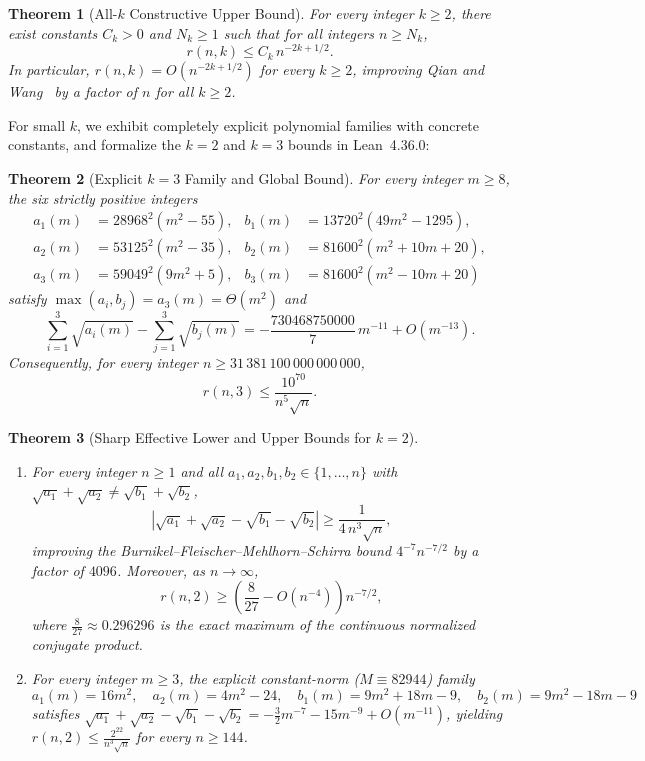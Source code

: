 \documentclass[11pt,a4paper]{article}
\newtheorem{theorem}{Theorem}[section]
\theoremstyle{definition}
\theoremstyle{remark}
\begin{document}
\begin{theorem}[All-$k$ Constructive Upper Bound]
\label{thm:general-k}
For every integer $k \ge 2$, there exist constants $C_k > 0$ and $N_k \ge 1$ such that for all integers $n \ge N_k$,
\[
r(n, k) \le C_k \, n^{-2k + 1/2}.
\]
In particular, $r(n, k) = O\!\left(n^{-2k + 1/2}\right)$ for every $k \ge 2$, improving Qian and Wang~\cite{QianWang2006} by a factor of $n$ for all $k \ge 2$.
\end{theorem}

For small $k$, we exhibit completely explicit polynomial families with concrete constants, and formalize the $k = 2$ and $k = 3$ bounds in Lean~4.36.0:

\begin{theorem}[Explicit $k = 3$ Family and Global Bound]
\label{thm:k3-explicit}
For every integer $m \ge 8$, the six strictly positive integers
\begin{align*}
a_1(m) &= 28968^2 (m^2 - 55), & b_1(m) &= 13720^2 (49 m^2 - 1295), \\
a_2(m) &= 53125^2 (m^2 - 35), & b_2(m) &= 81600^2 (m^2 + 10 m + 20), \\
a_3(m) &= 59049^2 (9 m^2 + 5), & b_3(m) &= 81600^2 (m^2 - 10 m + 20)
\end{align*}
satisfy $\max(a_i, b_j) = a_3(m) = \Theta(m^2)$ and
\[
\sum_{i=1}^3 \sqrt{a_i(m)} - \sum_{j=1}^3 \sqrt{b_j(m)} = -\frac{730468750000}{7}\, m^{-11} + O\!\left(m^{-13}\right).
\]
Consequently, for every integer $n \ge 31\,381\,100\,000\,000\,000$,
\[
r(n, 3) \le \frac{10^{70}}{n^5 \sqrt{n}}.
\]
\end{theorem}

\begin{theorem}[Sharp Effective Lower and Upper Bounds for $k = 2$]
\label{thm:k2-bounds}
\begin{enumerate}
\item[(a)] For every integer $n \ge 1$ and all $a_1, a_2, b_1, b_2 \in \{1, \dots, n\}$ with $\sqrt{a_1} + \sqrt{a_2} \neq \sqrt{b_1} + \sqrt{b_2}$,
\[
\left|\sqrt{a_1} + \sqrt{a_2} - \sqrt{b_1} - \sqrt{b_2}\right| \ge \frac{1}{4\, n^3 \sqrt{n}},
\]
improving the Burnikel--Fleischer--Mehlhorn--Schirra bound $4^{-7} n^{-7/2}$ by a factor of $4096$. Moreover, as $n \to \infty$,
\[
r(n, 2) \ge \left(\frac{8}{27} - O\!\left(n^{-4}\right)\right) n^{-7/2},
\]
where $\frac{8}{27} \approx 0.296296$ is the exact maximum of the continuous normalized conjugate product.
\item[(b)] For every integer $m \ge 3$, the explicit constant-norm ($M \equiv 82944$) family
\[
a_1(m) = 16 m^2,\quad a_2(m) = 4 m^2 - 24,\quad b_1(m) = 9 m^2 + 18 m - 9,\quad b_2(m) = 9 m^2 - 18 m - 9
\]
satisfies $\sqrt{a_1} + \sqrt{a_2} - \sqrt{b_1} - \sqrt{b_2} = -\frac{3}{2} m^{-7} - 15 m^{-9} + O(m^{-11})$, yielding $r(n, 2) \le \frac{2^{22}}{n^3 \sqrt{n}}$ for every $n \ge 144$.
\end{enumerate}
\end{theorem}
\end{document}
